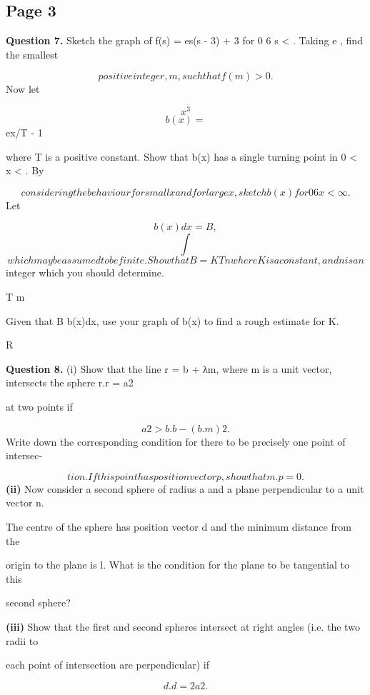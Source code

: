 \documentclass[12pt]{article}
\begin{document}
\subsection*{Page 3}
\begin{flushleft}
\bigskip\textbf{Question 7.} Sketch the graph of f(s) = es(s - 3) + 3 for 0 6 s < \infty. Taking e , find the smallest\par
\[positive integer, m, such that f(m) > 0.\]
Now let\par
\[x^3\]
\[b(x) =\]
ex/T - 1\par
where T is a positive constant. Show that b(x) has a single turning point in 0 < x < \infty. By\par
\[considering the behaviour for small x and for large x, sketch b(x) for 0 6 x < \infty.\]
Let\par
\infty\par
\[b(x) dx = B,\]
\[\int\]
\[which may be assumed to be finite. Show that B = KT n where K is a constant, and n is an\]
integer which you should determine.\par
T m\par
Given that B  b(x)dx, use your graph of b(x) to find a rough estimate for K.\par
R\par
\bigskip\textbf{Question 8.} (i) Show that the line r = b + λm, where m is a unit vector, intersects the sphere r.r = a2\par
at two points if\par
\[a 2 > b.b - (b.m) 2 .\]
Write down the corresponding condition for there to be precisely one point of intersec-\par
\[tion. If this point has position vector p, show that m.p = 0.\]
\textbf{(ii)} Now consider a second sphere of radius a and a plane perpendicular to a unit vector n.\par
The centre of the sphere has position vector d and the minimum distance from the\par
origin to the plane is l. What is the condition for the plane to be tangential to this\par
second sphere?\par
\textbf{(iii)} Show that the first and second spheres intersect at right angles (i.e. the two radii to\par
each point of intersection are perpendicular) if\par
\[d.d = 2a 2 .\]
\end{flushleft}
\end{document}
